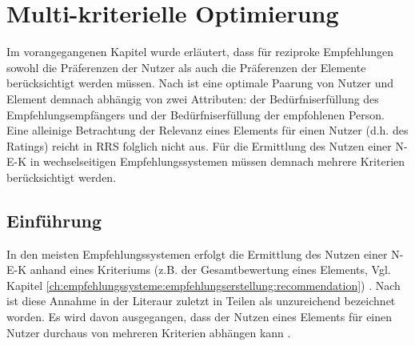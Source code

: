 
\chapter{Multi-kriterielle Optimierung}
\label{ch:erweiterungen}
Im vorangegangenen Kapitel wurde erläutert, dass für reziproke Empfehlungen sowohl die Präferenzen der Nutzer als auch die Präferenzen der Elemente berücksichtigt werden müssen.
Nach \textcite[S. 36]{li:inproceedings} ist eine optimale Paarung von Nutzer und Element demnach abhängig von zwei Attributen: der Bedürfniserfüllung des Empfehlungsempfängers und der Bedürfniserfüllung der empfohlenen Person.
Eine alleinige Betrachtung der Relevanz eines Elements für einen Nutzer (d.h. des Ratings) reicht in \ac{RRS} folglich nicht aus.
Für die Ermittlung des Nutzen einer \ac{N-E-K} in wechselseitigen Empfehlungssystemen müssen demnach mehrere Kriterien berücksichtigt werden.

\section{Einführung}
\label{ch:erweiterungen:einführung}
In den meisten Empfehlungssystemen erfolgt die Ermittlung des Nutzen einer \ac{N-E-K} anhand eines Kriteriums (z.B. der Gesamtbewertung eines Elements, Vgl. Kapitel \ref{ch:empfehlungssysteme:empfehlungserstellung:recommendation}) \cite[S. 847]{adomavicius:4:inbook}\cite[S. 745]{adomavicius:inproceedings}\cite[S. 49]{adomavicius:inproceedings:2}\cite[S. 424]{manouselis:article}\cite[S. 65]{lakiotaki:article}.
Nach \textcite[S. 847f.]{adomavicius:4:inbook} ist diese Annahme in der Literaur zuletzt in Teilen als unzureichend bezeichnet worden.
Es wird davon ausgegangen, dass der Nutzen eines Elements für einen Nutzer durchaus von mehreren Kriterien abhängen kann \cite[S. 847f.]{adomavicius:4:inbook}\cite[S. 424]{manouselis:article}.

